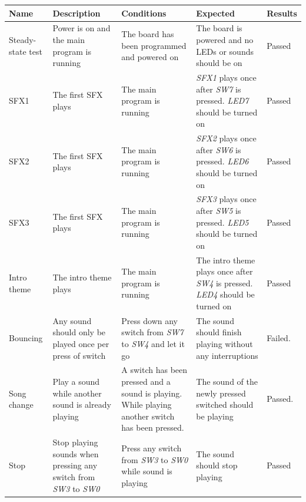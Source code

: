 \documentclass[a4paper,11pt]{article}
\begin{document}
\begin{center}
\renewcommand{\arraystretch}{1.1} %
\begin{tabular}[pos]{|m{45pt}|m{80pt}|m{90pt}|m{105pt}|m{60pt}|}
\hline  \textbf{Name} & \textbf{Description} & \textbf{Conditions} & \textbf{Expected} & \textbf{Results} \\ 

\hline Steady-state test & Power is on and the main program is running & The board has been programmed and powered on & The board is powered and no LEDs or sounds should be on & Passed \\

\hline SFX1 & The first SFX plays & The main program is running & \emph{SFX1} plays once after \emph{SW7} is pressed. \emph{LED7} should be turned on & Passed \\

\hline SFX2 & The first SFX plays & The main program is running & \emph{SFX2} plays once after \emph{SW6} is pressed. \emph{LED6} should be turned on & Passed \\

\hline SFX3 & The first SFX plays & The main program is running & \emph{SFX3} plays once after \emph{SW5} is pressed. \emph{LED5} should be turned on & Passed \\ 

\hline Intro theme & The intro theme plays & The main program is running & The intro theme plays once after \emph{SW4} is pressed. \emph{LED4} should be turned on & Passed \\

\hline Bouncing & Any sound should only be played once per press of switch & Press down any switch from \emph{SW7} to \emph{SW4} and let it go & The sound should finish playing without any interruptions & Failed. \\

\hline Song change & Play a sound while another sound is already playing & A switch has been pressed and a sound is playing. While playing another switch has been pressed. & The sound of the newly pressed switched should be playing & Passed. \\ 

\hline Stop & Stop playing sounds when pressing any switch from \emph{SW3} to \emph{SW0} & Press any switch from \emph{SW3} to \emph{SW0} while sound is playing & The sound should stop playing & Passed \\ 

\hline 
\end{tabular} 
\end{center}
\end{document}
